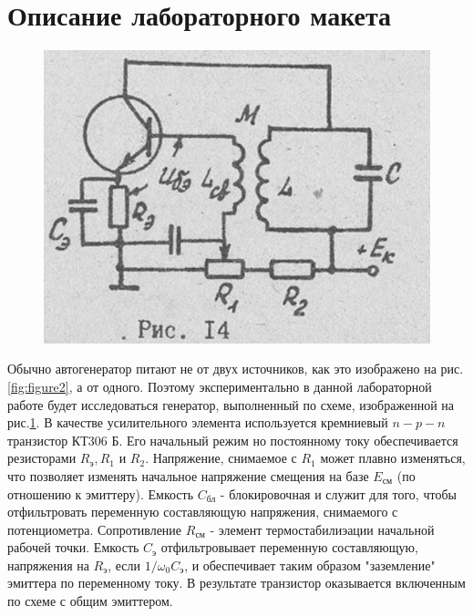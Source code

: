 \section{Описание лабораторного макета}

\begin{figure}
\includegraphics[width=\linewidth]{circuit/14.jpg}
\caption{}
\label{fig:figure14}
\vspace{-20pt}
\end{figure}

Обычно автогенератор питают не от двух источников, как это изображено на рис.\ref{fig:figure2}, а от одного. Поэтому экспериментально в данной лабораторной работе будет исследоваться генератор, выполненный по схеме, изображенной на рис.\ref{fig:figure14}. В качестве усилительного элемента используется кремниевый $n-p-n$ транзистор КТ306 Б. Его начальный режим но постоянному току обеспечивается резисторами $R_\text{э}, R_1$ и $R_2$. Напряжение, снимаемое с $R_1$ может плавно изменяться, что позволяет изменять начальное напряжение смещения на базе $E_\text{см}$ (по отношению к эмиттеру). Емкость $C_\text{бл}$	- блокировочная и служит для того, чтобы отфильтровать переменную составляющую напряжения, снимаемого с потенциометра. Сопротивление $R_\text{см}$ - элемент термостабилиэации начальной рабочей точки. Емкость $C_\text{э}$ отфильтровывает переменную составляющую, напряжения на $R_\text{э}$, если $1/\omega_0 C_\text{э}$, и обеспечивает таким образом "заземление" эмиттера по переменному току. В результате транзистор оказывается включенным по схеме с общим эмиттером.

